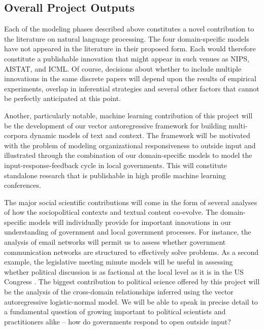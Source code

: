 \subsection{Overall Project Outputs}

Each of the modeling phases described above constitutes a novel contribution to the literature on natural language processing. The four domain-specific models have not appeared in the literature in their proposed form. Each would therefore constitute a publishable innovation that might appear in such venues as NIPS, AISTAT, and ICML. Of course, decisions about whether to include multiple innovations in the same discrete papers will depend upon the results of empirical experiments, overlap in inferential strategies and several other factors that cannot be perfectly anticipated at this point.

Another, particularly notable, machine learning contribution of this project will be the development of our vector autoregressive framework for building multi-corpora dynamic models of text and context. The framework will be motivated with the problem of modeling organizational responsiveness to outside input and illustrated through the combination of our domain-specific models to model the input-response-feedback cycle in local governments. This will constitute standalone research that is publishable in high profile machine learning conferences.

The major social scientific contributions will come in the form of several analyses of how the sociopolitical contexts and textual content co-evolve. The domain-specific models will individually provide for important innovations in our understanding of government and local government processes. For instance, the analysis of email networks will permit us to assess whether government communication networks are structured to effectively solve problems. As a second example, the legislative meeting minute models will be useful in assessing whether political discussion is as factional at the local level as it is in the US Congress \cite{}. The biggest contribution to political science offered by this project will be the analysis of the cross-domain relationships inferred using the vector autoregressive logistic-normal model. We will be able to speak in precise detail to a fundamental question of growing important to political scientists and practitioners alike -- how do governments respond to open outside input?

